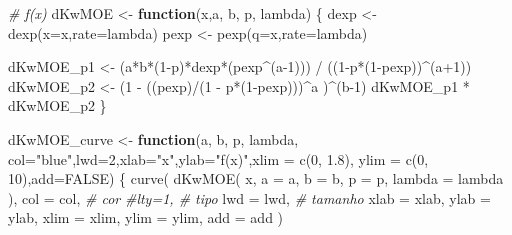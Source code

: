 \documentclass[
]{article}
\newenvironment{Shaded}{\begin{snugshade}}{\end{snugshade}}
\newcommand{\AttributeTok}[1]{\textcolor[rgb]{0.77,0.63,0.00}{#1}}
\newcommand{\CommentTok}[1]{\textcolor[rgb]{0.56,0.35,0.01}{\textit{#1}}}
\newcommand{\ConstantTok}[1]{\textcolor[rgb]{0.00,0.00,0.00}{#1}}
\newcommand{\ControlFlowTok}[1]{\textcolor[rgb]{0.13,0.29,0.53}{\textbf{#1}}}
\newcommand{\DecValTok}[1]{\textcolor[rgb]{0.00,0.00,0.81}{#1}}
\newcommand{\FloatTok}[1]{\textcolor[rgb]{0.00,0.00,0.81}{#1}}
\newcommand{\FunctionTok}[1]{\textcolor[rgb]{0.00,0.00,0.00}{#1}}
\newcommand{\NormalTok}[1]{#1}
\newcommand{\OtherTok}[1]{\textcolor[rgb]{0.56,0.35,0.01}{#1}}
\newcommand{\SpecialCharTok}[1]{\textcolor[rgb]{0.00,0.00,0.00}{#1}}
\newcommand{\StringTok}[1]{\textcolor[rgb]{0.31,0.60,0.02}{#1}}
\begin{document}
\begin{Shaded}
\begin{Highlighting}[]
\CommentTok{\# f(x)}
\NormalTok{dKwMOE }\OtherTok{\textless{}{-}} \ControlFlowTok{function}\NormalTok{(x,a, b, p, lambda)}
\NormalTok{\{}
\NormalTok{    dexp }\OtherTok{\textless{}{-}} \FunctionTok{dexp}\NormalTok{(}\AttributeTok{x=}\NormalTok{x,}\AttributeTok{rate=}\NormalTok{lambda)}
\NormalTok{    pexp }\OtherTok{\textless{}{-}} \FunctionTok{pexp}\NormalTok{(}\AttributeTok{q=}\NormalTok{x,}\AttributeTok{rate=}\NormalTok{lambda)}
    
\NormalTok{    dKwMOE\_p1 }\OtherTok{\textless{}{-}}\NormalTok{ (a}\SpecialCharTok{*}\NormalTok{b}\SpecialCharTok{*}\NormalTok{(}\DecValTok{1}\SpecialCharTok{{-}}\NormalTok{p)}\SpecialCharTok{*}\NormalTok{dexp}\SpecialCharTok{*}\NormalTok{(pexp}\SpecialCharTok{\^{}}\NormalTok{(a}\DecValTok{{-}1}\NormalTok{))) }\SpecialCharTok{/}\NormalTok{ ((}\DecValTok{1}\SpecialCharTok{{-}}\NormalTok{p}\SpecialCharTok{*}\NormalTok{(}\DecValTok{1}\SpecialCharTok{{-}}\NormalTok{pexp))}\SpecialCharTok{\^{}}\NormalTok{(a}\SpecialCharTok{+}\DecValTok{1}\NormalTok{))}
\NormalTok{    dKwMOE\_p2 }\OtherTok{\textless{}{-}}\NormalTok{ (}\DecValTok{1} \SpecialCharTok{{-}}\NormalTok{ ((pexp)}\SpecialCharTok{/}\NormalTok{(}\DecValTok{1} \SpecialCharTok{{-}}\NormalTok{ p}\SpecialCharTok{*}\NormalTok{(}\DecValTok{1}\SpecialCharTok{{-}}\NormalTok{pexp)))}\SpecialCharTok{\^{}}\NormalTok{a )}\SpecialCharTok{\^{}}\NormalTok{(b}\DecValTok{{-}1}\NormalTok{)}
\NormalTok{    dKwMOE\_p1 }\SpecialCharTok{*}\NormalTok{ dKwMOE\_p2}
\NormalTok{\}}


\NormalTok{dKwMOE\_curve }\OtherTok{\textless{}{-}} \ControlFlowTok{function}\NormalTok{(a, b, p, lambda,}
                         \AttributeTok{col=}\StringTok{"blue"}\NormalTok{,}\AttributeTok{lwd=}\DecValTok{2}\NormalTok{,}\AttributeTok{xlab=}\StringTok{"x"}\NormalTok{,}\AttributeTok{ylab=}\StringTok{"f(x)"}\NormalTok{,}\AttributeTok{xlim =} \FunctionTok{c}\NormalTok{(}\DecValTok{0}\NormalTok{, }\FloatTok{1.8}\NormalTok{), }\AttributeTok{ylim =} \FunctionTok{c}\NormalTok{(}\DecValTok{0}\NormalTok{, }\DecValTok{10}\NormalTok{),}\AttributeTok{add=}\ConstantTok{FALSE}\NormalTok{) \{}
    \FunctionTok{curve}\NormalTok{(}
        \FunctionTok{dKwMOE}\NormalTok{(}
\NormalTok{            x,}
            \AttributeTok{a =}\NormalTok{ a,}
            \AttributeTok{b =}\NormalTok{ b,}
            \AttributeTok{p =}\NormalTok{ p,}
            \AttributeTok{lambda =}\NormalTok{ lambda}
\NormalTok{        ),}
        \AttributeTok{col =}\NormalTok{ col, }\CommentTok{\# cor}
        \CommentTok{\#lty=1, \# tipo}
        \AttributeTok{lwd =}\NormalTok{ lwd, }\CommentTok{\# tamanho}
        \AttributeTok{xlab =}\NormalTok{ xlab,}
        \AttributeTok{ylab =}\NormalTok{ ylab,}
        \AttributeTok{xlim =}\NormalTok{ xlim,}
        \AttributeTok{ylim =}\NormalTok{ ylim,}
        \AttributeTok{add =}\NormalTok{ add}
\NormalTok{    )}
    

\end{Highlighting}
\end{Shaded}
\end{document}
